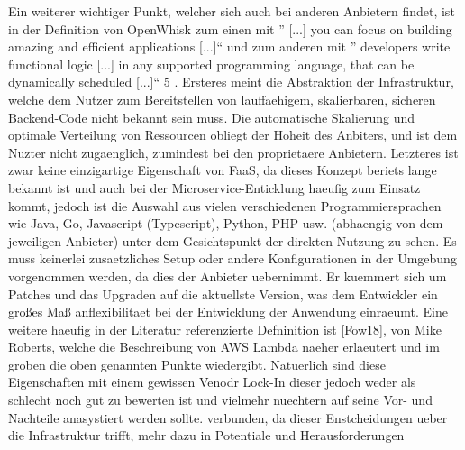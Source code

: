 Ein weiterer wichtiger Punkt, welcher sich auch bei anderen Anbietern findet, ist in der Definition von OpenWhisk zum einen mit ” [...] you can focus on building amazing and efficient applications [...]“ und zum anderen mit ” developers write functional logic [...] in any supported programming language, that can be dynamically scheduled [...]“ 5 . Ersteres meint die Abstraktion der Infrastruktur, welche dem Nutzer zum Bereitstellen von lauffaehigem, skalierbaren, sicheren Backend-Code nicht bekannt sein muss. Die automatische Skalierung und optimale Verteilung von Ressourcen obliegt der Hoheit des Anbiters, und ist dem Nuzter nicht zugaenglich, zumindest bei den proprietaere Anbietern. Letzteres ist zwar keine einzigartige Eigenschaft von FaaS, da dieses Konzept beriets lange bekannt ist und auch bei der Microservice-Enticklung haeufig zum Einsatz kommt, jedoch ist die Auswahl aus vielen verschiedenen Programmiersprachen wie Java, Go, Javascript (Typescript), Python, PHP usw. (abhaengig von dem jeweiligen Anbieter) unter dem Gesichtspunkt der direkten Nutzung zu sehen. Es muss keinerlei zusaetzliches Setup oder andere Konfigurationen in der Umgebung vorgenommen werden, da dies der Anbieter uebernimmt. Er kuemmert sich um Patches und das Upgraden auf die aktuellste Version, was dem Entwickler ein großes Maß anflexibilitaet bei der Entwicklung der Anwendung einraeumt. Eine weitere haeufig in der Literatur referenzierte Defninition ist [Fow18], von Mike Roberts, welche die Beschreibung von AWS Lambda naeher erlaeutert und im groben die oben genannten Punkte wiedergibt. Natuerlich sind diese Eigenschaften mit einem gewissen Venodr Lock-In dieser jedoch weder als schlecht noch gut zu bewerten ist und vielmehr nuechtern auf seine Vor- und Nachteile anasystiert werden sollte. verbunden, da dieser Enstcheidungen ueber die Infrastruktur trifft, mehr dazu in Potentiale und Herausforderungen

